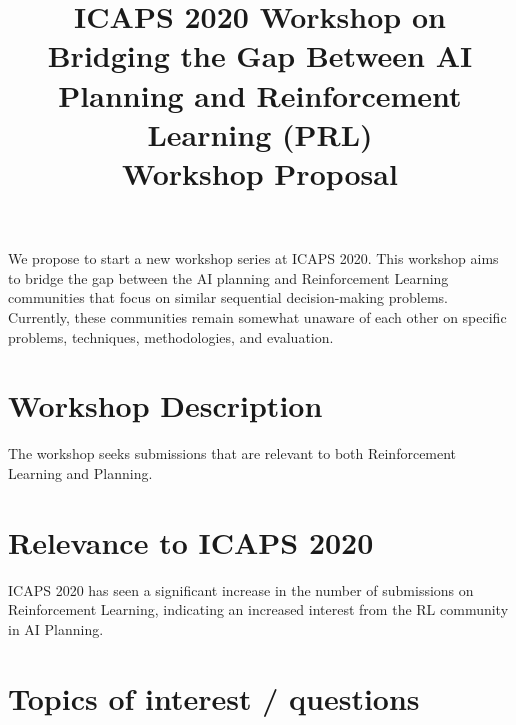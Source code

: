\documentclass[10pt]{article}
\begin{document}
\title{ICAPS 2020 Workshop on \\ Bridging the Gap Between AI Planning and Reinforcement Learning (PRL)\\ \vspace*{0.7cm} Workshop Proposal
}
\date{}

\author{}

\maketitle


We propose to start a new workshop series at ICAPS 2020. This workshop aims to
bridge the gap between the AI planning and Reinforcement Learning communities that focus on similar sequential decision-making problems. Currently, these communities remain somewhat unaware of each other on specific problems, techniques,  methodologies, and evaluation.

\section*{Workshop Description}

The workshop seeks submissions that are relevant to both Reinforcement Learning
and Planning. 






\section*{Relevance to ICAPS 2020}
ICAPS 2020 has seen a significant increase in the number of submissions on
Reinforcement Learning, indicating an increased interest from the RL community
in AI Planning.

\section*{Topics of interest / questions}
\end{document}
